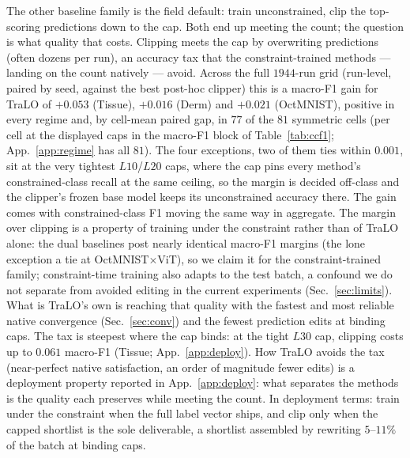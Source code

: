 \documentclass[10pt]{article}
\begin{document}
The other baseline family is the field default: train unconstrained, clip
the top-scoring predictions down to the cap. Both end up meeting the
count; the question is what quality that costs. Clipping meets the cap by
overwriting predictions (often dozens per run), an accuracy tax that the
constraint-trained methods --- landing on the count natively --- avoid.
Across the full $1944$-run grid (run-level, paired by seed, against the
best post-hoc clipper) this is a macro-F1 gain for TraLO of $+0.053$
(Tissue), $+0.016$ (Derm) and $+0.021$ (OctMNIST), positive in every
regime and, by cell-mean paired gap, in $77$ of the $81$ symmetric cells
(per cell at the displayed caps in the macro-F1 block of
Table~\ref{tab:ccf1}; App.~\ref{app:regime} has all $81$). The four
exceptions, two of them ties within $0.001$, sit at the very tightest
$L10$/$L20$ caps, where the cap pins every method's constrained-class
recall at the same ceiling, so the margin is decided off-class and the
clipper's frozen base model keeps its unconstrained accuracy there. The
gain comes with constrained-class F1 moving the same way in aggregate.
The margin over clipping is a property of training under the constraint
rather than of TraLO alone: the dual baselines post nearly identical
macro-F1 margins (the lone exception a tie at OctMNIST$\times$ViT), so we
claim it for the constraint-trained family; constraint-time training also
adapts to the test batch, a confound we do not separate from avoided
editing in the current experiments (Sec.~\ref{sec:limits}). What is
TraLO's own is reaching that quality with the fastest and most reliable
native convergence (Sec.~\ref{sec:conv}) and the fewest prediction edits
at binding caps. The tax is steepest where the cap binds: at the tight
$L30$ cap, clipping costs up to $0.061$ macro-F1 (Tissue;
App.~\ref{app:deploy}). How TraLO avoids the tax (near-perfect native
satisfaction, an order of magnitude fewer edits) is a deployment property
reported in App.~\ref{app:deploy}: what separates the methods is the
quality each preserves while meeting the count. In deployment terms:
train under the constraint when the full label vector ships, and clip only
when the capped shortlist is the sole deliverable, a shortlist assembled
by rewriting $5$--$11\%$ of the batch at binding caps.
\end{document}
